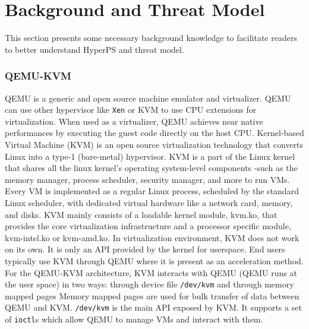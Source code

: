 \section{Background and Threat Model}%
\label{sec:background_and_threat_model}

This section presents some necessary background knowledge to facilitate readers to better understand HyperPS and threat model. 



\subsubsection{QEMU-KVM}%
\label{ssub:qemu_kvm}
QEMU is a generic and open source machine emulator and virtualizer. QEMU can use other hypervisor like \verb|Xen| or KVM to use CPU extensions for virtualization. When used as a virtualizer, QEMU achieves near native performances by executing the guest code directly on the host CPU.
Kernel-based Virtual Machine (KVM) is an open source virtualization technology that converts Linux into a type-1 (bare-metal) hypervisor. KVM is a part of the Linux kernel that shares all the linux kernel's operating system-level components -such as the memory manager, process scheduler, security manager, and more to run VMs. Every VM is implemented as a regular Linux process, scheduled by the standard Linux scheduler, with dedicated virtual hardware like a network card, memory, and disks. KVM mainly consists of a loadable kernel module, kvm.ko, that provides the core virtualization infrastructure and a processor specific module, kvm-intel.ko or kvm-amd.ko.
In virtualization environment, KVM does not work on its own. It is only an API provided by the kernel for userspace. End users typically use KVM through QEMU where it is present as an acceleration method.
For the QEMU-KVM architecture, KVM interacts with QEMU (QEMU runs at the user space) in two ways: through device file \verb|/dev/kvm| and through memory mapped pages
Memory mapped pages are used for bulk transfer of data between QEMU and KVM. \verb|/dev/kvm| is the main API exposed by KVM. It supports a set of \verb|ioctl|s which allow QEMU to manage VMs and interact with them.



